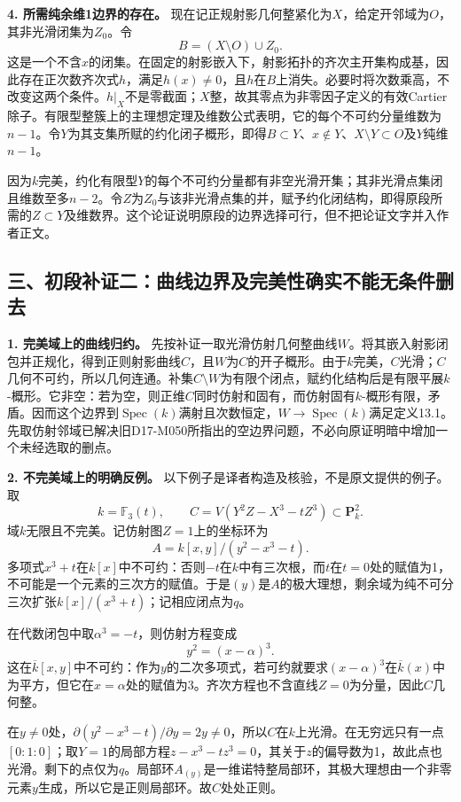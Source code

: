 \documentclass[UTF8,a4paper]{ctexbook}
\DeclareMathOperator{\Spec}{Spec}
\begin{document}
\noindent\textbf{4. 所需纯余维1边界的存在。}
现在记正规射影几何整紧化为$X$，给定开邻域为$O$，其非光滑闭集为$Z_0$。令
\[
B=(X\setminus O)\cup Z_0.
\]
这是一个不含$x$的闭集。在固定的射影嵌入下，射影拓扑的齐次主开集构成基，因此存在正次数齐次式$h$，满足$h(x)\ne0$，且$h$在$B$上消失。必要时将次数乘高，不改变这两个条件。$h|_X$不是零截面；$X$整，故其零点为非零因子定义的有效Cartier除子。有限型整簇上的主理想定理及维数公式表明，它的每个不可约分量维数为$n-1$。令$Y$为其支集所赋的约化闭子概形，即得$B\subset Y$、$x\notin Y$、$X\setminus Y\subset O$及$Y$纯维$n-1$。

因为$k$完美，约化有限型$Y$的每个不可约分量都有非空光滑开集；其非光滑点集闭且维数至多$n-2$。令$Z$为$Z_0$与该非光滑点集的并，赋予约化闭结构，即得原段所需的$Z\subset Y$及维数界。这个论证说明原段的边界选择可行，但不把论证文字并入作者正文。

\subsection*{三、初段补证二：曲线边界及完美性确实不能无条件删去}

\noindent\textbf{1. 完美域上的曲线归约。}
先按补证一取光滑仿射几何整曲线$W$。将其嵌入射影闭包并正规化，得到正则射影曲线$C$，且$W$为$C$的开子概形。由于$k$完美，$C$光滑；$C$几何不可约，所以几何连通。补集$C\setminus W$为有限个闭点，赋约化结构后是有限平展$k$-概形。它非空：若为空，则正维$C$同时仿射和固有，而仿射固有$k$-概形有限，矛盾。因而这个边界到$\Spec(k)$满射且次数恒定，$W\to\Spec(k)$满足定义13.1。先取仿射邻域已解决旧D17-M050所指出的空边界问题，不必向原证明暗中增加一个未经选取的删点。

\noindent\textbf{2. 不完美域上的明确反例。}
以下例子是译者构造及核验，不是原文提供的例子。取
\[
k=\mathbb F_3(t),\qquad
C=V(Y^2Z-X^3-tZ^3)\subset\mathbf P^2_k.
\]
域$k$无限且不完美。记仿射图$Z=1$上的坐标环为
\[
A=k[x,y]/(y^2-x^3-t).
\]
多项式$x^3+t$在$k[x]$中不可约：否则$-t$在$k$中有三次根，而$t$在$t=0$处的赋值为1，不可能是一个元素的三次方的赋值。于是$(y)$是$A$的极大理想，剩余域为纯不可分三次扩张$k[x]/(x^3+t)$；记相应闭点为$q$。

在代数闭包中取$\alpha^3=-t$，则仿射方程变成
\[
y^2=(x-\alpha)^3.
\]
这在$\overline k[x,y]$中不可约：作为$y$的二次多项式，若可约就要求$(x-\alpha)^3$在$\overline k(x)$中为平方，但它在$x=\alpha$处的赋值为3。齐次方程也不含直线$Z=0$为分量，因此$C$几何整。

在$y\ne0$处，$\partial(y^2-x^3-t)/\partial y=2y\ne0$，所以$C$在$k$上光滑。在无穷远只有一点$[0:1:0]$；取$Y=1$的局部方程$z-x^3-tz^3=0$，其关于$z$的偏导数为1，故此点也光滑。剩下的点仅为$q$。局部环$A_{(y)}$是一维诺特整局部环，其极大理想由一个非零元素$y$生成，所以它是正则局部环。故$C$处处正则。
\end{document}
